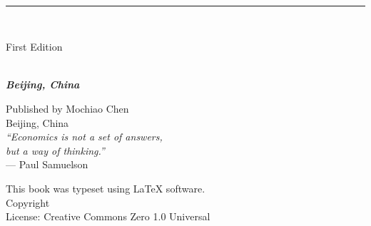 \documentclass{book}
\makeatletter
\newcommand{\booksubtitle}{A notes of Intermediate Microeconomics course}
\newcommand{\booklicense}{Creative Commons Zero 1.0 Universal}
\newcommand{\authorsubtitle}{Beijing, China}
\newcommand{\booktitle}{\@title}
\newcommand{\bookauthor}{\@author}
\makeatother
\begin{document}
\begin{titlepage}
\begin{flushleft}

\textbf{\fontsize{48}{54}\selectfont \booktitle\\}

\par\noindent\rule{\textwidth}{4pt}\\


\begin{flushright}
\Large First Edition
\end{flushright}

\vspace{\fill}

\textbf{\large \bookauthor}\\[3.5pt]
\textbf{\large \textit{\authorsubtitle}}

\vspace{\fill}

\begin{center}
\small{
Published by Mochiao Chen\\
Beijing, China\\[1em]
\textit{“Economics is not a set of answers,\\
but a way of thinking.”}\\[0.5em]
--- Paul Samuelson
}
\end{center}


\end{flushleft}
\end{titlepage}
\restoregeometry%

\thispagestyle{empty}

\begin{flushleft}
\vspace*{\fill}
This book was typeset using \LaTeX{} software.\\
\vspace{\fill}
Copyright \textcopyright{} \the\year{} \bookauthor\\
License: \booklicense%
\end{flushleft}
\end{document}
